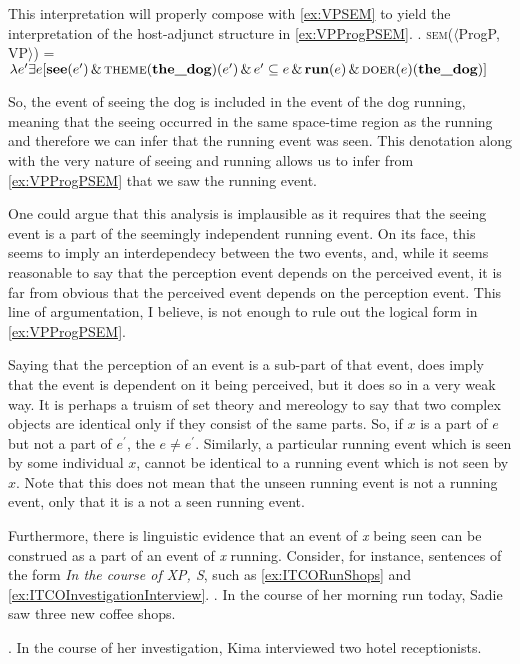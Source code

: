 \documentclass[MilwayThesis]{subfiles}
\begin{document}
This interpretation will properly compose with \cref{ex:VPSEM} to yield the interpretation of the host-adjunct structure in \cref{ex:VPProgPSEM}.
\ex.\label{ex:VPProgPSEM} \textsc{sem}($\langle$ProgP, VP$\rangle$) = $\lambda e^{\prime} \exists e [ \textbf{see}(e^{\prime})\,\&\,\textsc{theme}(\textbf{the\_dog})(e^{\prime})\,\&\,e^{\prime} \subseteq e\,\&\,\textbf{run}(e)\,\&\,\textsc{doer}(e)(\textbf{the\_dog})]$

So, the event of seeing the dog is included in the event of the dog running, meaning that the seeing occurred in the same space-time region as the running and therefore we can infer that the running event was seen.
This denotation along with the very nature of seeing and running allows us to infer from \cref{ex:VPProgPSEM} that we saw the running event.

One could argue that this analysis is implausible as it requires that the seeing event is a part of the seemingly independent running event.
On its face, this seems to imply an interdependecy between the two events, and, while it seems reasonable to say that the perception event depends on the perceived event, it is far from obvious that the perceived event depends on the perception event.
This line of argumentation, I believe, is not enough to rule out the logical form in \cref{ex:VPProgPSEM}.


Saying that the perception of an event is a sub-part of that event, does imply that the event is dependent on it being perceived, but it does so in a very weak way.
It is perhaps a truism of set theory and mereology to say that two complex objects are identical only if they consist of the same parts.
So, if $x$ is a part of $e$ but not a part of $e^{\prime}$, the $e \neq e^{\prime}$.
Similarly, a particular running event which is seen by some individual $x$, cannot be identical to a running event which is not seen by $x$.
Note that this does not mean that the unseen running event is not a running event, only that it is a not a seen running event.

Furthermore, there is linguistic evidence that an event of \textit{x} being seen can be construed as a part of an event of \textit{x} running.
Consider, for instance, sentences of the form \textit{In the course of XP, S}, such as \cref{ex:ITCORunShops} and \cref{ex:ITCOInvestigationInterview}.
\ex.\label{ex:ITCORunShops} In the course of her morning run today, Sadie saw three new coffee shops.

\ex.\label{ex:ITCOInvestigationInterview} In the course of her investigation, Kima interviewed two hotel receptionists.
\end{document}
